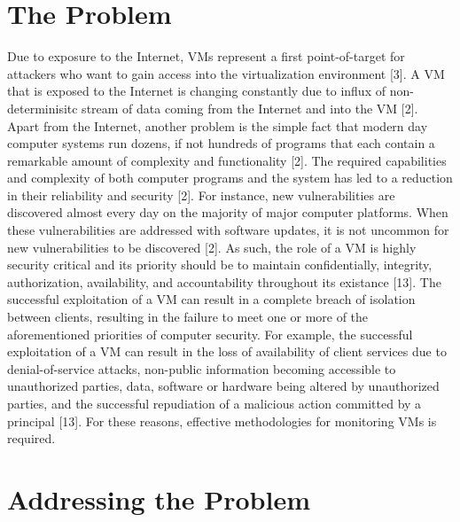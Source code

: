 \documentclass{report}
\begin{document}
\begin{spacing}{1.5}
\section{The Problem}

{\large 
Due to exposure to the Internet, VMs represent a first point-of-target for attackers who want to gain access into the virtualization environment [3]. A VM that is exposed to the Internet is changing constantly due to influx of non-determinisitc stream of data coming from the Internet and into the VM [2]. Apart from the Internet, another problem is the simple fact that modern day computer systems run dozens, if not hundreds of programs that each contain a remarkable amount of complexity and functionality [2]. The required capabilities and complexity of both computer programs and the system has led to a reduction in their reliability and security [2]. For instance, new vulnerabilities are discovered almost every day on the majority of major computer platforms. When these vulnerabilities are addressed with software updates, it is not uncommon for new vulnerabilities to be discovered [2]. As such, the role of a VM is highly security critical and its priority should be to maintain confidentially, integrity, authorization, availability, and accountability throughout its existance [13]. The successful exploitation of a VM can result in a complete breach of isolation between clients, resulting in the failure to meet one or more of the aforementioned priorities of computer security. For example, the successful exploitation of a VM can result in the loss of availability of client services due to denial-of-service attacks, non-public information becoming accessible to unauthorized parties, data, software or hardware being altered by unauthorized parties, and the successful repudiation of a malicious action committed by a principal [13]. For these reasons, effective methodologies for monitoring VMs is required.
\newline
}

\section{Addressing the Problem}


\end{spacing}
\end{document}
